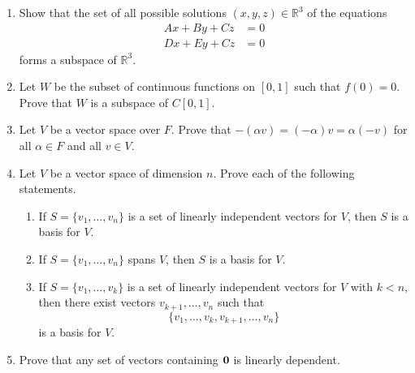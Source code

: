 {\begin{enumerate}
\begin{enumerate}
  \item
$\{ (x_1, x_2, x_3) : 3 x_1 + 4 x_3 = 0, 2 x_1 - x_2 + x_3 = 0 \}$

  \item
$\{ (x_1, x_2, x_3) : x_1 - 2 x_2 + 2 x_3 = 2 \}$

  \item
$\{ (x_1, x_2, x_3) : 3 x_1 - 2 x_2^2 = 0 \}$

\end{enumerate}


\item
Show that the set of all possible solutions $(x, y, z) \in {\mathbb R}^3$
of the equations
\begin{align*}
Ax + B y + C z & =  0 \\
D x + E y + C z & =  0
\end{align*}
forms a subspace of ${\mathbb R}^3$.


\item
Let $W$ be the subset of continuous functions on $[0, 1]$ such that
$f(0) = 0$.  Prove that $W$ is a subspace of $C[0, 1]$.




\item
Let $V$ be a vector space over $F$. Prove that $-(\alpha v) =
(-\alpha)v = \alpha(-v)$ for all $\alpha \in F$ and all $v \in V$. 


\item
Let $V$ be a vector space of dimension $n$. Prove each of the
following statements. 
\begin{enumerate}

 \item
If $S = \{v_1, \ldots, v_n \}$ is a set of linearly independent
vectors for $V$, then $S$ is a basis for $V$. 

 \item
If $S = \{v_1, \ldots, v_n \}$ spans $V$, then $S$ is a basis for $V$.

 \item 
If $S = \{v_1, \ldots, v_k \}$ is a set of linearly independent
vectors for $V$ with $k < n$, then there exist vectors $v_{k+1},
\ldots, v_n$ such that 
\[
\{v_1, \ldots, v_k, v_{k+1}, \ldots, v_n \}
\] 
is a basis for $V$. 

\end{enumerate}


\item
Prove that any set of vectors containing ${\bold 0}$ is linearly
dependent. 



\end{enumerate}}
